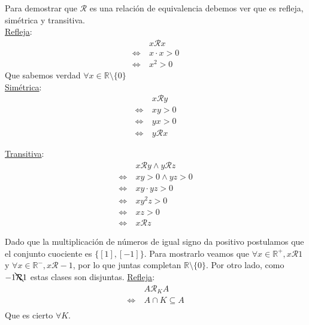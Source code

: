 \documentclass[dcc]{fcfmcourse}
\begin{document}
\begin{problems}
\problem Para demostrar que $\mathcal{R}$ es una relación de equivalencia debemos ver que es refleja, simétrica y transitiva.\\

\underline{Refleja}: \\
\begin{align*}
&x \mathcal{R} x\\
\Leftrightarrow\ & x \cdot x > 0\\
\Leftrightarrow\ & x^2 > 0
\end{align*}
Que sabemos verdad $\forall x \in \mathbb{R}\setminus \{0\}$\\

\underline{Simétrica}: \\
\begin{align*}
&x \mathcal{R} y\\
\Leftrightarrow\ & xy > 0\\
\Leftrightarrow\ & yx > 0\\
\Leftrightarrow\ & y \mathcal{R} x
\end{align*}

\underline{Transitiva}: \\
\begin{align*}
&x \mathcal{R} y \land y \mathcal{R} z\\
\Leftrightarrow\ & xy > 0 \land yz > 0\\
\Leftrightarrow\ & xy \cdot yz > 0\\
\Leftrightarrow\ & xy^2z > 0\\
\Leftrightarrow\ & xz > 0\\
\Leftrightarrow\ & x \mathcal{R} z
\end{align*}

Dado que la multiplicación de números de igual signo da positivo postulamos que el conjunto cuociente es $\{\left[1\right], \left[-1\right]\}$. Para mostrarlo veamos que $\forall x \in \mathbb{R}^+, x \mathcal{R} 1$ y $\forall x \in \mathbb{R}^-, x \mathcal{R} -1$, por lo que juntas completan $\mathbb{R} \setminus \{0\}$. Por otro lado, como $-1 \bcancel{\mathcal{R}} 1$ estas clases son disjuntas.
\problem  
\underline{Refleja}: \\
\begin{align*}
&A \mathcal{R}_{K} A\\
\Leftrightarrow\ & A \cap K \subseteq A\\
\end{align*}
Que es cierto $\forall K$.


\end{problems}
\end{document}
